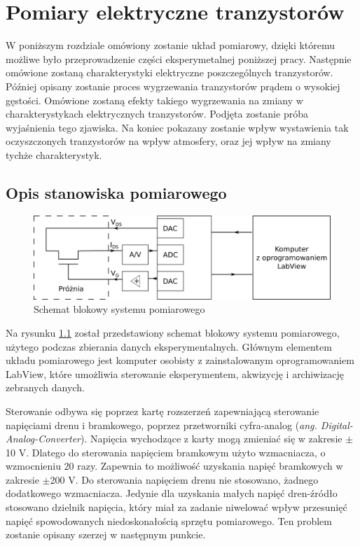\chapter{Pomiary elektryczne tranzystorów}

W poniższym rozdziale omówiony zostanie układ pomiarowy, dzięki któremu możliwe było przeprowadzenie części eksperymetalnej
poniższej pracy. Następnie omówione zostaną charakterystyki elektryczne poszczególnych tranzystorów. Później opisany 
zostanie proces wygrzewania tranzystorów prądem o wysokiej gęstości. Omówione zostaną efekty takiego wygrzewania na 
zmiany w charakterystykach elektrycznych tranzystorów. Podjęta zostanie próba wyjaśnienia tego zjawiska. Na koniec 
pokazany zostanie wpływ wystawienia tak oczyszczonych tranzystorów na wpływ atmosfery, oraz jej wpływ na zmiany 
tychże charakterystyk.
	\section{Opis stanowiska pomiarowego}

	\begin{figure}[ht]
	\centering
	\includegraphics[width=1.0\textwidth]{./Rozdzial_4/obrazki/ukladblokowy.png}
	\caption{Schemat blokowy systemu pomiarowego}
	\label{fig:ukladblokowy}
	\end{figure}


	Na rysunku \ref{fig:ukladblokowy} został przedstawiony schemat blokowy systemu pomiarowego, użytego podczas zbierania danych 
	eksperymentalnych. Głównym elementem układu pomiarowego jest komputer osobisty z zainstalowanym
	oprogramowaniem LabView, które umożliwia sterowanie eksperymentem, akwizycję i archiwizację zebranych danych.
	
	Sterowanie odbywa się poprzez kartę rozszerzeń zapewniającą sterowanie napięciami drenu i bramkowego, 
	poprzez przetworniki cyfra-analog (\textit{ang. Digital-Analog-Converter}). Napięcia wychodzące z 
	karty mogą zmieniać się w zakresie $\pm$10 V. Dlatego do sterowania napięciem bramkowym użyto wzmacniacza, 
	o wzmocnieniu 20 razy. Zapewnia to możliwość uzyskania napięć bramkowych w zakresie $\pm$200 V. 
	Do sterowania napięciem drenu nie stosowano, żadnego dodatkowego wzmacniacza. Jedynie dla uzyskania 
	małych napięć dren-źródło stosowano dzielnik napięcia, który miał za zadanie niwelować wpływ przesunięć napięć
	spowodowanych niedoskonałością sprzętu pomiarowego. Ten problem zostanie opisany szerzej w następnym punkcie.

